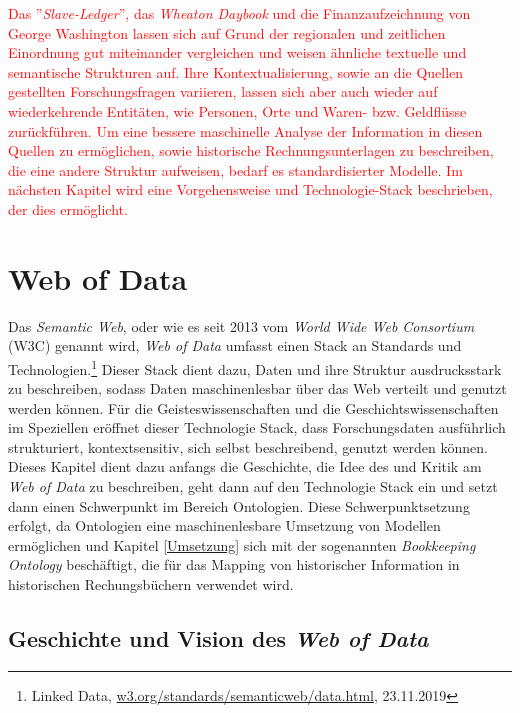 \documentclass[12pt,a4paper]{article}
\begin{document}
\newpage
\textcolor{red}{
Das ''\textit{Slave-Ledger}'', das \textit{Wheaton Daybook} und die Finanzaufzeichnung von George Washington lassen sich auf Grund der regionalen und zeitlichen Einordnung gut miteinander vergleichen und weisen ähnliche textuelle und semantische Strukturen auf. Ihre Kontextualisierung, sowie an die Quellen gestellten Forschungsfragen variieren, lassen sich aber auch wieder auf wiederkehrende Entitäten, wie Personen, Orte und Waren- bzw. Geldflüsse zurückführen. Um eine bessere maschinelle Analyse der Information in diesen Quellen zu ermöglichen, sowie historische Rechnungsunterlagen zu beschreiben, die eine andere Struktur aufweisen, bedarf es standardisierter Modelle. Im nächsten Kapitel wird eine Vorgehensweise und Technologie-Stack beschrieben, der dies ermöglicht.
}


\newpage
\section{Web of Data}
\label{WebofData}
Das \textit{Semantic Web}, oder wie es seit 2013 vom \textit{World Wide Web Consortium} (W3C) genannt wird, \textit{Web of Data} umfasst einen Stack an Standards und Technologien.\footnote{Linked Data, \url{w3.org/standards/semanticweb/data.html}, 23.11.2019} Dieser Stack dient dazu, Daten und ihre Struktur ausdrucksstark zu beschreiben, sodass Daten maschinenlesbar über das Web verteilt und genutzt werden können. Für die Geisteswissenschaften und die Geschichtswissenschaften im Speziellen eröffnet dieser Technologie Stack, dass Forschungsdaten ausführlich strukturiert, kontextsensitiv, sich selbst beschreibend, genutzt werden können.
\\
Dieses Kapitel dient dazu anfangs die Geschichte, die Idee des und Kritik am \textit{Web of Data} zu beschreiben, geht dann auf den Technologie Stack ein und setzt dann einen Schwerpunkt im Bereich Ontologien. Diese Schwerpunktsetzung erfolgt, da Ontologien eine maschinenlesbare Umsetzung von Modellen ermöglichen und Kapitel \ref{Umsetzung} sich mit der sogenannten \textit{Bookkeeping Ontology} beschäftigt, die für das Mapping von historischer Information in historischen Rechungsbüchern verwendet wird.  

\subsection{Geschichte und Vision des \textit{Web of Data}}
\end{document}
